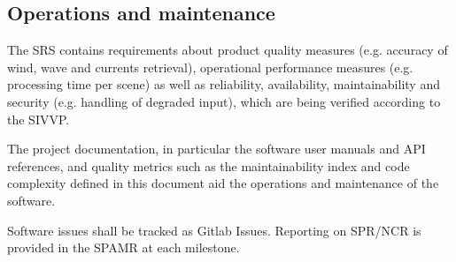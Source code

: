 \subsection{Operations and maintenance}
\label{subsec:maintenance}


The SRS contains requirements about product quality measures (e.g. accuracy of wind, wave and currents retrieval), operational performance measures (e.g. processing time per scene) as well as reliability, availability, maintainability and security (e.g. handling of degraded input), which are being verified according to the SIVVP.

The project documentation, in particular the software user manuals and API references, and quality metrics such as the maintainability index and code complexity defined in this document aid the operations and maintenance of the software.

Software issues shall be tracked as Gitlab Issues. Reporting on SPR/NCR is provided in the SPAMR at each milestone.